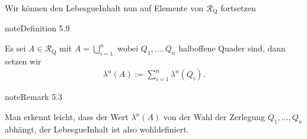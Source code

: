 \documentclass[letterpaper,10pt,english]{jupyterBook}
\begin{document}
\sphinxAtStartPar
Wir können den Lebesgue\sphinxhyphen{}Inhalt nun auf Elemente von \(\mathcal{R}_{\text{Q}}\) fortsetzen
\label{masstheorie/masstheorie:definition-15}
\begin{sphinxadmonition}{note}{Definition 5.9}



\sphinxAtStartPar
Es sei \(A\in\mathcal{R}_{\text{Q}}\) mit \(A=\bigcup_{i=1}^n\) wobei \(Q_1,\ldots,Q_n\)  halboffene Quader sind, dann setzen wir
\begin{equation*}
\begin{split}\lambda^n(A):=\sum_{i=1}^{n} \lambda^n(Q_i).\end{split}
\end{equation*}\end{sphinxadmonition}
\label{masstheorie/masstheorie:remark-16}
\begin{sphinxadmonition}{note}{Remark 5.3}



\sphinxAtStartPar
Man erkennt leicht, dass der Wert \(\lambda^n(A)\)  von der Wahl der Zerlegung \(Q_1,\ldots,Q_n\) abhängt, der Lebesgue\sphinxhyphen{}Inhalt ist also wohldefiniert.
\end{sphinxadmonition}
\end{document}
